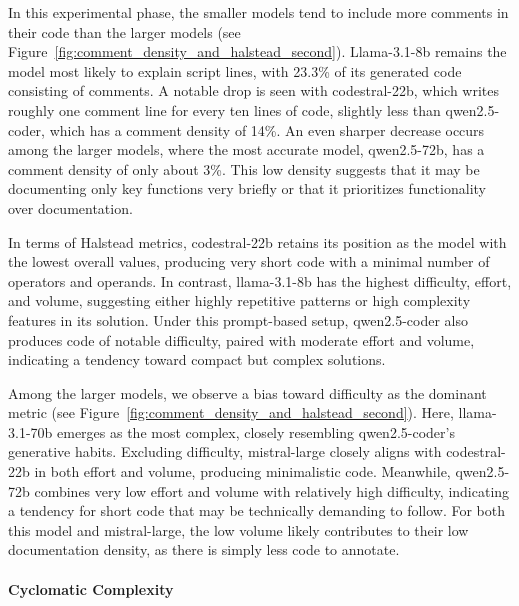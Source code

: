 \documentclass{DESSThesis}
\begin{document}
\noindent In this experimental phase, the smaller models tend to include more comments in their code than the larger models (see Figure~\ref{fig:comment_density_and_halstead_second}). Llama-3.1-8b remains the model most likely to explain script lines, with 23.3\% of its generated code consisting of comments. A notable drop is seen with codestral-22b, which writes roughly one comment line for every ten lines of code, slightly less than qwen2.5-coder, which has a comment density of 14\%. An even sharper decrease occurs among the larger models, where the most accurate model, qwen2.5-72b, has a comment density of only about 3\%. This low density suggests that it may be documenting only key functions very briefly or that it prioritizes functionality over documentation.

In terms of Halstead metrics, codestral-22b retains its position as the model with the lowest overall values, producing very short code with a minimal number of operators and operands. In contrast, llama-3.1-8b has the highest difficulty, effort, and volume, suggesting either highly repetitive patterns or high complexity features in its solution. Under this prompt-based setup, qwen2.5-coder also produces code of notable difficulty, paired with moderate effort and volume, indicating a tendency toward compact but complex solutions. 

Among the larger models, we observe a bias toward difficulty as the dominant metric (see Figure~\ref{fig:comment_density_and_halstead_second}). Here, llama-3.1-70b emerges as the most complex, closely resembling qwen2.5-coder's generative habits. Excluding difficulty, mistral-large closely aligns with codestral-22b in both effort and volume, producing minimalistic code. Meanwhile, qwen2.5-72b combines very low effort and volume with relatively high difficulty, indicating a tendency for short code that may be technically demanding to follow. For both this model and mistral-large, the low volume likely contributes to their low documentation density, as there is simply less code to annotate.

\paragraph{Cyclomatic Complexity}\mbox{}\\
\end{document}
